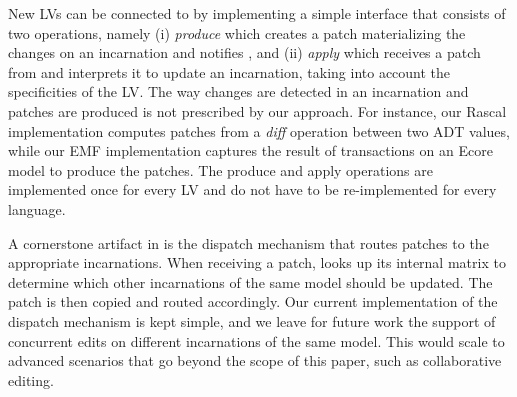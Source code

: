 New LVs can be connected to \prism by implementing a simple interface that consists of two operations, namely (i) \emph{produce} which creates a patch materializing the changes on an incarnation and notifies \prism, and (ii) \emph{apply} which receives a patch from \prism and interprets it to update an incarnation, taking into account the specificities of the LV.
The way changes are detected in an incarnation and patches are produced is not prescribed by our approach.
For instance, our Rascal implementation computes patches from a \emph{diff} operation between two ADT values, while our EMF implementation captures the result of transactions on an Ecore model to produce the patches.
The produce and apply operations are implemented once for every LV and do not have to be re-implemented for every language.

A cornerstone artifact in \prism is the dispatch mechanism that routes patches to the appropriate incarnations.
When receiving a patch, \prism looks up its internal matrix to determine which other incarnations of the same model should be updated.
The patch is then copied and routed accordingly.
Our current implementation of the dispatch mechanism is kept simple, and we leave for future work the support of concurrent edits on different incarnations of the same model. This would scale \prism to advanced scenarios that go beyond the scope of this paper, such as collaborative editing.

